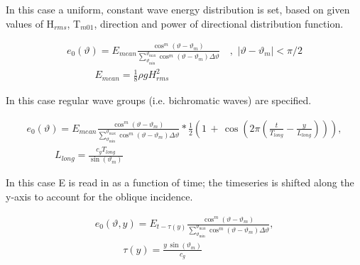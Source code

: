 In this case a uniform, constant wave energy distribution is set, based on given values of H${}_{rms}$, T${}_{m01}$, direction and power of directional distribution function.

\begin{equation} \label{2.18)} 
\begin{array}{l} {e_{0} (\vartheta )=E_{mean} \frac{\cos ^{m} \left(\vartheta -\vartheta _{m} \right)}{\sum _{\vartheta _{\min } }^{\vartheta _{\max } }\cos ^{m} \left(\vartheta -\vartheta _{m} \right)\Delta \vartheta  } \, \, \, \, \, \, ,\, \, \left|\vartheta -\vartheta _{m} \right|<\pi /2} \\ {\, \, \, \, \, \, \, \, \, \, \, \, \, \, \, \, \, E_{mean} =\frac{1}{8} \rho gH_{rms}^{2} } \end{array} 
\end{equation} 

\textit{}

In this case regular wave groups (i.e. bichromatic waves) are specified.

\begin{equation} \label{2.19)} 
\begin{array}{l} {e_{0} (\vartheta )=E_{mean} \frac{\cos ^{m} \left(\vartheta -\vartheta _{m} \right)}{\sum _{\vartheta _{\min } }^{\vartheta _{\max } }\cos ^{m} \left(\vartheta -\vartheta _{m} \right)\Delta \vartheta  } *\frac{1}{2} \left(1\, +\, \cos \left(2\pi \left(\frac{t}{T_{long} } -\frac{y}{L_{long} } \right)\right)\right),} \\ {\, \, \, \, \, \, \, \, \, \, \, \, \, \, \, \, \, L_{long} =\frac{c_{g} T_{long} }{\sin (\vartheta _{m} )} } \end{array} 
\end{equation} 

\textit{}

In this case E is read in as a function of time; the timeseries is shifted along the y-axis to account for the oblique incidence.

\begin{equation} \label{2.20)} 
\begin{array}{l} {e_{0} (\vartheta ,y)=E_{t-\tau (y)} \frac{\cos ^{m} \left(\vartheta -\vartheta _{m} \right)}{\sum _{\vartheta _{\min } }^{\vartheta _{\max } }\cos ^{m} \left(\vartheta -\vartheta _{m} \right)\Delta \vartheta  } ,} \\ {\, \, \, \, \, \, \, \, \, \, \, \, \, \, \, \, \, \tau (y)=\frac{y\, \sin (\vartheta _{m} )}{c_{g} } } \end{array} 
\end{equation} 

